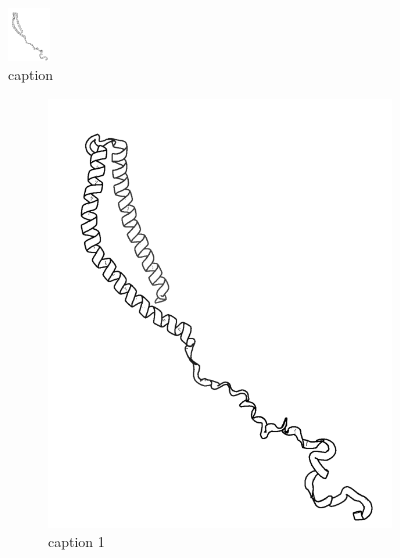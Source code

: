 
\begin{figure}[h] %
	\centering
	\includegraphics[width = 0.1\textwidth]{pics/alpha_struct.png}
	\caption{caption}
	\label{fig:plasmid}	
\end{figure}



\begin{figure}[h] %
	\centering
	\begin{subfigure}[t]{0.1\linewidth}
		\includegraphics[width = \textwidth]{pics/alpha_struct.png}
		\caption{caption 1}\label{fig:alpha}
	\end{subfigure}
	\begin{subfigure}[t]{0.1\linewidth}

\end{subfigure}
\end{figure}

